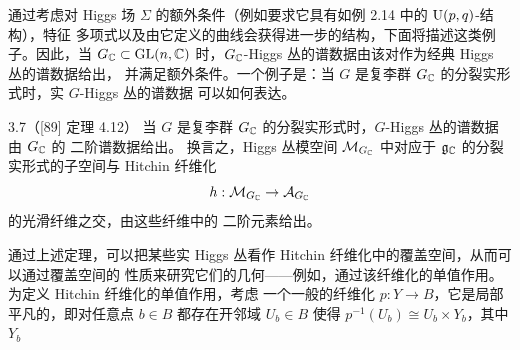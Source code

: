 通过考虑对 Higgs 场 $\Sigma$ 的额外条件（例如要求它具有如例 2.14 中的 $\mathrm{U}(p,q)$-结构），特征
多项式以及由它定义的曲线会获得进一步的结构，下面将描述这类例子。因此，当
$G_{\mathbb{C}}\subset\mathrm{GL}(n,\mathbb{C})$ 时，$G_{\mathbb{C}}$-Higgs 丛的谱数据由该对作为经典 Higgs 丛的谱数据给出，
并满足额外条件。一个例子是：当 $G$ 是复李群 $G_{\mathbb{C}}$ 的分裂实形式时，实 $G$-Higgs 丛的谱数据
可以如何表达。

\begin{thm}{3.7（[89] 定理 4.12）}
当 $G$ 是复李群 $G_{\mathbb{C}}$ 的分裂实形式时，$G$-Higgs 丛的谱数据由 $G_{\mathbb{C}}$ 的 二阶谱数据给出。
换言之，Higgs 丛模空间 $\mathcal{M}_{G_{\mathbb{C}}}$ 中对应于 $\mathfrak{g}_{\mathbb{C}}$ 的分裂实形式的子空间与
Hitchin 纤维化
\[
h:\mathcal{M}_{G_{\mathbb{C}}}\to\mathcal{A}_{G_{\mathbb{C}}}
\]
的光滑纤维之交，由这些纤维中的 二阶元素给出。
\end{thm}

通过上述定理，可以把某些实 Higgs 丛看作 Hitchin 纤维化中的覆盖空间，从而可以通过覆盖空间的
性质来研究它们的几何——例如，通过该纤维化的单值作用。为定义 Hitchin 纤维化的单值作用，考虑
一个一般的纤维化 $p:Y\to B$，它是局部平凡的，即对任意点 $b\in B$ 都存在开邻域
$U_b\in B$ 使得 $p^{-1}(U_b)\cong U_b\times Y_b$，其中 $Y_b$
